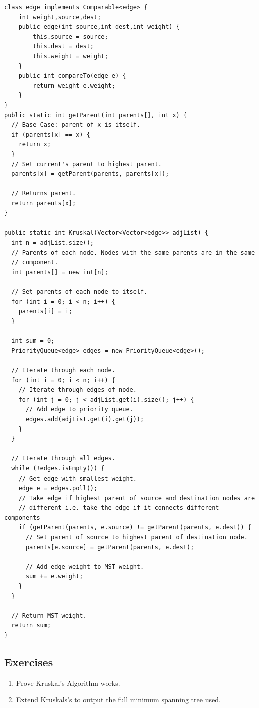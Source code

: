 \documentclass[11pt,oneside]{book}
\begin{document}
\begin{lstlisting}
class edge implements Comparable<edge> {
    int weight,source,dest;
    public edge(int source,int dest,int weight) {
        this.source = source;
        this.dest = dest;
        this.weight = weight;
    }
    public int compareTo(edge e) {
        return weight-e.weight;
    }
}
public static int getParent(int parents[], int x) {
  // Base Case: parent of x is itself.
  if (parents[x] == x) {
    return x;
  }
  // Set current's parent to highest parent.
  parents[x] = getParent(parents, parents[x]);

  // Returns parent.
  return parents[x];
}

public static int Kruskal(Vector<Vector<edge>> adjList) {
  int n = adjList.size();
  // Parents of each node. Nodes with the same parents are in the same
  // component.
  int parents[] = new int[n];

  // Set parents of each node to itself.
  for (int i = 0; i < n; i++) {
    parents[i] = i;
  }

  int sum = 0;
  PriorityQueue<edge> edges = new PriorityQueue<edge>();

  // Iterate through each node.
  for (int i = 0; i < n; i++) {
    // Iterate through edges of node.
    for (int j = 0; j < adjList.get(i).size(); j++) {
      // Add edge to priority queue.
      edges.add(adjList.get(i).get(j));
    }
  }

  // Iterate through all edges.
  while (!edges.isEmpty()) {
    // Get edge with smallest weight.
    edge e = edges.poll();
    // Take edge if highest parent of source and destination nodes are
    // different i.e. take the edge if it connects different components
    if (getParent(parents, e.source) != getParent(parents, e.dest)) {
      // Set parent of source to highest parent of destination node.
      parents[e.source] = getParent(parents, e.dest);
      
      // Add edge weight to MST weight.
      sum += e.weight;
    }
  }

  // Return MST weight.
  return sum;
}
\end{lstlisting}

\subsection{Exercises}

\begin{enumerate}
\item Prove Kruskal's Algorithm works.
\item Extend Kruskals's to output the full minimum spanning tree used.
\end{enumerate}
\end{document}
